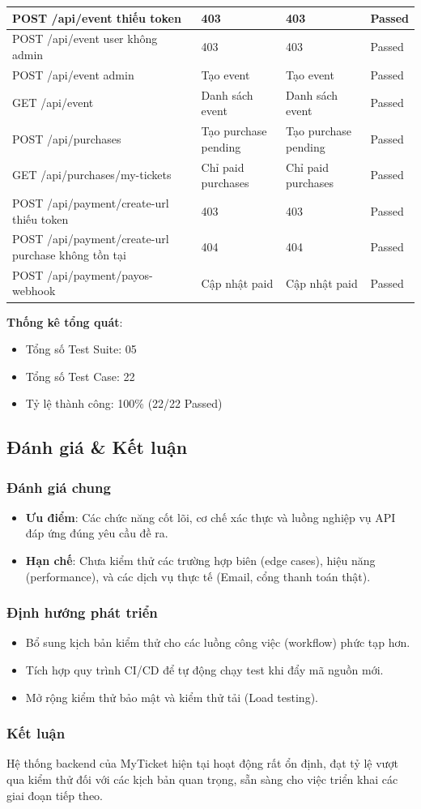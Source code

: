\begin{longtable}{|p{}|p{}|p{}|p{}|}
POST /api/event thiếu token & 403 & 403 & Passed \\ \hline
POST /api/event user không admin & 403 & 403 & Passed \\ \hline
POST /api/event admin & Tạo event & Tạo event & Passed \\ \hline

GET /api/event & Danh sách event & Danh sách event & Passed \\ \hline
POST /api/purchases & Tạo purchase pending & Tạo purchase pending & Passed \\ \hline
GET /api/purchases/my-tickets & Chỉ paid purchases & Chỉ paid purchases & Passed \\ \hline

POST /api/payment/create-url thiếu token & 403 & 403 & Passed \\ \hline
POST /api/payment/create-url purchase không tồn tại & 404 & 404 & Passed \\ \hline
POST /api/payment/payos-webhook & Cập nhật paid & Cập nhật paid & Passed \\ \hline
\end{longtable}
\textbf{Thống kê tổng quát}:
\begin{itemize}
    \item[-] Tổng số Test Suite: 05
    \item[-] Tổng số Test Case: 22
    \item[-] Tỷ lệ thành công: 100\% (22/22 Passed)
\end{itemize}

\subsection{Đánh giá \& Kết luận}
\subsubsection{Đánh giá chung}
\begin{itemize}
    \item[-] \textbf{Ưu điểm}: Các chức năng cốt lõi, cơ chế xác thực và luồng nghiệp vụ API đáp ứng đúng yêu cầu đề ra.
    \item[-] \textbf{Hạn chế}: Chưa kiểm thử các trường hợp biên (edge cases), hiệu năng (performance), và các dịch vụ thực tế (Email, cổng thanh toán thật).
\end{itemize}
\subsubsection{Định hướng phát triển}
\begin{itemize}
    \item[-] Bổ sung kịch bản kiểm thử cho các luồng công việc (workflow) phức tạp hơn.
    \item[-] Tích hợp quy trình CI/CD để tự động chạy test khi đẩy mã nguồn mới.
    \item[-] Mở rộng kiểm thử bảo mật và kiểm thử tải (Load testing).
\end{itemize}
\subsubsection{Kết luận}
Hệ thống backend của MyTicket hiện tại hoạt động rất ổn định, đạt tỷ lệ vượt qua kiểm thử đối với các kịch bản quan trọng, sẵn sàng cho việc triển khai các giai đoạn tiếp theo.
